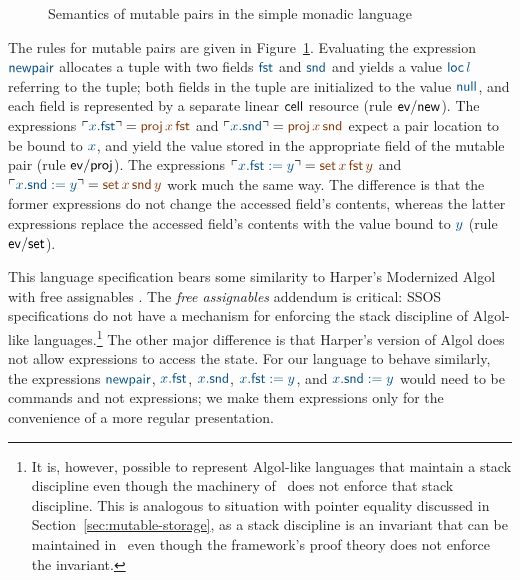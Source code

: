 \begin{figure}
\caption{Semantics of mutable pairs in the simple monadic language}
\label{fig:ssos-monadic2}
\end{figure}

The rules for mutable pairs are given in
Figure~\ref{fig:ssos-monadic2}. Evaluating the expression $\obj{\sf
  newpair}$ allocates a tuple with two fields $\obj{\sf fst}$ and 
$\obj{\sf
  snd}$ and yields a value $\obj{{\sf loc}\,l}$ referring to the tuple; both
fields in the tuple are initialized to the value $\obj{\sf null}$, and
each field is represented by a separate linear ${\sf cell}$ resource
(rule ${\sf ev/new}$). The expressions $\interp{x.{\sf fst}} = \lf{{\sf
  proj}\,x\,{\sf fst}}$ and $\interp{x.{\sf snd}} = \lf{{\sf proj}\,x\,{\sf
  snd}}$ expect a pair location to be bound to $\obj{x}$, and yield the value
stored in the appropriate field of the mutable pair (rule ${\sf
  ev/proj}$). The expressions $\interp{x.{\sf fst} := y} = \lf{{\sf
  set}\,x\,{\sf fst}\,y}$ and $\interp{x.{\sf snd} := y} = \lf{{\sf
  set}\,x\,{\sf snd}\,y}$ work much the same way. The difference is
that the former expressions do not change the accessed field's
contents, whereas the latter expressions replace the accessed field's
contents with the value bound to $\obj{y}$ (rule ${\sf ev/set}$).

This language specification bears some similarity to Harper's
Modernized Algol with free assignables \cite[Chapter
36]{harper12practical}. The {\it free assignables} addendum is
critical: SSOS specifications do not have a mechanism for enforcing
the stack discipline of Algol-like languages.\footnote{It is, however,
  possible to represent Algol-like languages that maintain a stack
  discipline even though the machinery of \sls~does not enforce that
  stack discipline. This is analogous to situation with pointer
  equality discussed in Section~\ref{sec:mutable-storage}, as a stack
  discipline is an invariant that can be maintained in \sls~even
  though the framework's proof theory does not enforce the invariant.}
The other major difference is that Harper's version of Algol does not
allow expressions to access the state.  For our language to behave
similarly, the expressions $\obj{\sf newpair}$, $\obj{x.{\sf fst}}$,
$\obj{x.{\sf snd}}$, $\obj{x.{\sf fst} := y}$, and $\obj{x.{\sf snd}
  := y}$ would need to be commands and not expressions; we make them
expressions only for the convenience of a more regular presentation.


